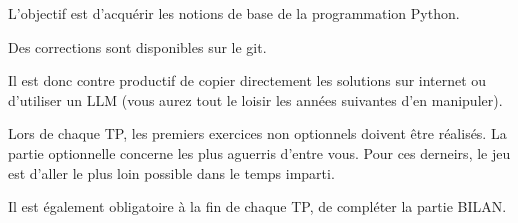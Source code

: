 \documentclass[10pt, a4paper]{article}
\begin{document}
\begin{tcolorbox}[lefttitle=2cm, colframe=gray!75!black, title= \textbf{Les Travaux Pratiques}]

L'objectif est d'acquérir les notions de base de la programmation Python.

Des corrections sont disponibles sur le git.

Il est donc contre productif de copier directement les solutions sur internet ou d'utiliser un LLM (vous aurez tout le loisir les années suivantes d'en manipuler).

Lors de chaque TP, les premiers exercices non optionnels doivent être réalisés. 
La partie optionnelle concerne les plus aguerris d'entre vous.
Pour ces derneirs, le jeu est d'aller le plus loin possible dans le temps imparti.

Il est également obligatoire à la fin de chaque TP, de compléter la partie BILAN.

\end{tcolorbox}
\end{document}
